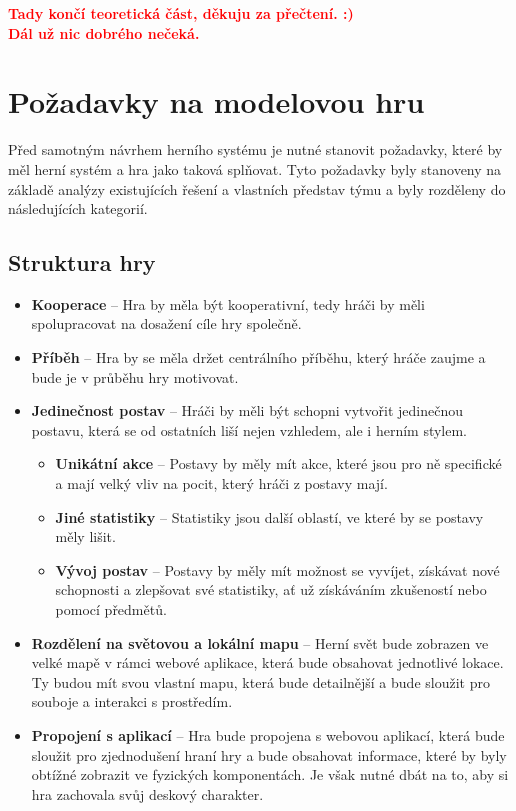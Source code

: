 \textbf{\textcolor{red}{Tady končí teoretická část, děkuju za přečtení. :)}\\\textcolor{red}{Dál už nic dobrého nečeká.}}

\chapter{Požadavky na modelovou hru}
\label{chap:requirements}

Před samotným návrhem herního systému je nutné stanovit požadavky, které by měl herní systém a hra jako taková splňovat. Tyto požadavky byly stanoveny na základě analýzy existujících řešení  a vlastních představ týmu a byly rozděleny do následujících kategorií.

\section{Struktura hry}
\label{sec:req_structure}

\begin{itemize}
    \item \textbf{Kooperace} -- 
        Hra by měla být kooperativní, tedy hráči by měli spolupracovat na dosažení cíle hry společně.
    \item \textbf{Příběh} -- 
        Hra by se měla držet centrálního příběhu, který hráče zaujme a bude je v průběhu hry motivovat.
    \item \textbf{Jedinečnost postav} -- 
        Hráči by měli být schopni vytvořit jedinečnou postavu, která se od ostatních liší nejen vzhledem, ale i herním stylem.

    \begin{itemize}
        \item \textbf{Unikátní akce} -- 
            Postavy by měly mít akce, které jsou pro ně specifické a mají velký vliv na pocit, který hráči z postavy mají.
        \item \textbf{Jiné statistiky} -- 
            Statistiky jsou další oblastí, ve které by se postavy měly lišit.
        \item \textbf{Vývoj postav} -- 
            Postavy by měly mít možnost se vyvíjet, získávat nové schopnosti a zlepšovat své statistiky, ať už získáváním zkušeností nebo pomocí předmětů.
    \end{itemize}

    \item \textbf{Rozdělení na světovou a lokální mapu} -- 
        Herní svět bude zobrazen ve velké mapě v rámci webové aplikace, která bude obsahovat jednotlivé lokace. Ty budou mít svou vlastní mapu, která bude detailnější a bude sloužit pro souboje a interakci s prostředím.
    \item \textbf{Propojení s aplikací} -- 
        Hra bude propojena s webovou aplikací, která bude sloužit pro zjednodušení hraní hry a bude obsahovat informace, které by byly obtížné zobrazit ve fyzických komponentách. Je však nutné dbát na to, aby si hra zachovala svůj deskový charakter.
\end{itemize}

